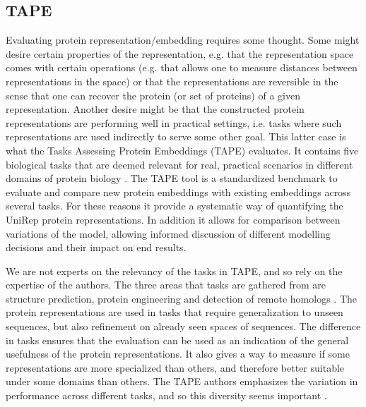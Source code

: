 \documentclass[a4paper,12pt]{article}
\begin{document}
\subsection{TAPE}
\label{section:tape}
Evaluating protein representation/embedding requires some thought. Some might desire certain properties of the representation, e.g. that the representation space comes with certain operations (e.g. that allows one to measure distances between representations in the space) or that the representations are reversible in the sense that one can recover the protein (or set of proteins) of a given representation. Another desire might be that the constructed protein representations are performing well in practical settings, i.e. tasks where such representations are used indirectly to serve some other goal. This latter case is what the Tasks Assessing Protein Embeddings (TAPE) evaluates. It contains five biological tasks that are deemed relevant for real, practical scenarios in different domains of protein biology \cite{tape2019}. The TAPE tool is a standardized benchmark to evaluate and compare new protein embeddings with existing embeddings across several tasks. For these reasons it provide a systematic way of quantifying the UniRep protein representations. In addition it allows for comparison between variations of the model, allowing informed discussion of different modelling decisions and their impact on end results.

We are not experts on the relevancy of the tasks in TAPE, and so rely on the expertise of the authors. The three areas that tasks are gathered from are structure prediction, protein engineering and detection of remote homologs \cite{tape2019}. The protein representations are used in tasks that require generalization to unseen sequences, but also refinement on already seen spaces of sequences. The difference in tasks ensures that the evaluation can be used as an indication of the general usefulness of the protein representations. It also gives a way to measure if some representations are more specialized than others, and therefore better suitable under some domains than others. The TAPE authors emphasizes the variation in performance across different tasks, and so this diversity seems important \cite{tape2019}.
\end{document}
